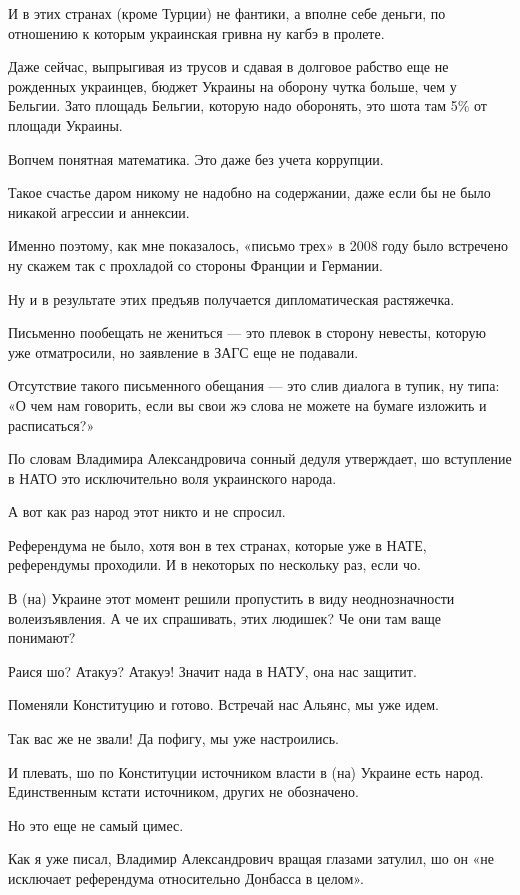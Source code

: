 \begin{multicols}{2}
И в этих странах (кроме Турции) не фантики, а вполне себе деньги, по отношению
к которым украинская гривна ну кагбэ в пролете.

Даже сейчас, выпрыгивая из трусов и сдавая в долговое рабство еще не рожденных
украинцев, бюджет Украины на оборону чутка больше, чем у Бельгии. Зато площадь
Бельгии, которую надо оборонять, это шота там 5\% от площади Украины.

Вопчем понятная математика. Это даже без учета коррупции.

Такое счастье даром никому не надобно на содержании, даже если бы не было
никакой агрессии и аннексии.

Именно поэтому, как мне показалось, «письмо трех» в 2008 году было встречено ну
скажем так с прохладой со стороны Франции и Германии.

Ну и в результате этих предъяв получается дипломатическая растяжечка.

Письменно пообещать не жениться — это плевок в сторону невесты, которую уже
отматросили, но заявление в ЗАГС еще не подавали.

Отсутствие такого письменного обещания — это слив диалога в тупик, ну типа: «О
чем нам говорить, если вы свои жэ слова не можете на бумаге изложить и
расписаться?»

По словам Владимира Александровича сонный дедуля утверждает, шо вступление в
НАТО это исключительно воля украинского народа.

А вот как раз народ этот никто и не спросил.

Референдума не было, хотя вон в тех странах, которые уже в НАТЕ, референдумы
проходили. И в некоторых по нескольку раз, если чо.

В (на) Украине этот момент решили пропустить в виду неоднозначности
волеизъявления. А че их спрашивать, этих людишек? Че они там ваще понимают?

Раися шо? Атакуэ? Атакуэ! Значит нада в НАТУ, она нас защитит.

Поменяли Конституцию и готово. Встречай нас Альянс, мы уже идем.

Так вас же не звали! Да пофигу, мы уже настроились.

И плевать, шо по Конституции источником власти в (на) Украине есть народ.
Единственным кстати источником, других не обозначено.

Но это еще не самый цимес.

Как я уже писал, Владимир Александрович вращая глазами затулил, шо он «не
исключает референдума относительно Донбасса в целом».


\end{multicols}
